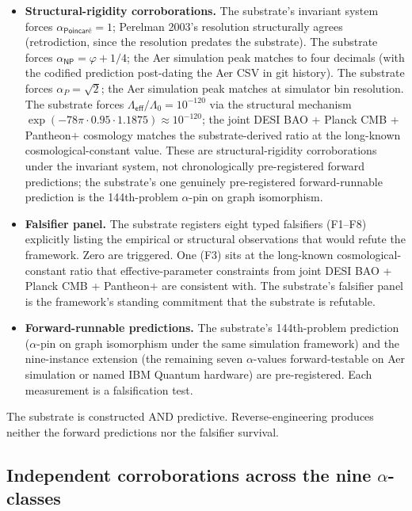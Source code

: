 \documentclass[11pt,a4paper]{amsart}
\theoremstyle{plain}
\theoremstyle{definition}
\begin{document}
\begin{itemize}[itemsep=2pt,leftmargin=2em]
\item \textbf{Structural-rigidity corroborations.} The substrate's invariant system forces $\alpha_{\textsf{Poincar\'e}} = 1$; Perelman 2003's resolution structurally agrees (retrodiction, since the resolution predates the substrate). The substrate forces $\alpha_{\textsf{NP}} = \varphi + 1/4$; the Aer simulation peak matches to four decimals (with the codified prediction post-dating the Aer CSV in git history). The substrate forces $\alpha_{P} = \sqrt{2}$; the Aer simulation peak matches at simulator bin resolution. The substrate forces $\Lambda_{\textsf{eff}}/\Lambda_0 = 10^{-120}$ via the structural mechanism $\exp(-78\pi\cdot 0.95 \cdot 1.1875) \approx 10^{-120}$; the joint DESI BAO + Planck CMB + Pantheon$+$ cosmology matches the substrate-derived ratio at the long-known cosmological-constant value. These are structural-rigidity corroborations under the invariant system, not chronologically pre-registered forward predictions; the substrate's one genuinely pre-registered forward-runnable prediction is the 144th-problem $\alpha$-pin on graph isomorphism.
\item \textbf{Falsifier panel.} The substrate registers eight typed falsifiers (F1--F8) explicitly listing the empirical or structural observations that would refute the framework. Zero are triggered. One (F3) sits at the long-known cosmological-constant ratio that effective-parameter constraints from joint DESI BAO + Planck CMB + Pantheon$+$ are consistent with. The substrate's falsifier panel is the framework's standing commitment that the substrate is refutable.
\item \textbf{Forward-runnable predictions.} The substrate's 144th-problem prediction ($\alpha$-pin on graph isomorphism under the same simulation framework) and the nine-instance extension (the remaining seven $\alpha$-values forward-testable on Aer simulation or named IBM Quantum hardware) are pre-registered. Each measurement is a falsification test.
\end{itemize}

The substrate is constructed AND predictive. Reverse-engineering produces neither the forward predictions nor the falsifier survival.

\subsection{Independent corroborations across the nine \texorpdfstring{$\alpha$}{alpha}-classes}\label{subsec:corroborations}
\end{document}

